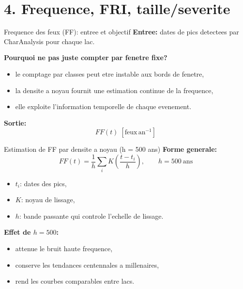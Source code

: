 \documentclass[aspectratio=169,11pt]{beamer}
\begin{document}
\section{4. Frequence, FRI, taille/severite}

\begin{frame}{Frequence des feux (FF): entree et objectif}
\textbf{Entree:} dates de pics detectees par CharAnalysis pour chaque lac.

\textbf{Pourquoi ne pas juste compter par fenetre fixe?}
\begin{itemize}
  \item le comptage par classes peut etre instable aux bords de fenetre,
  \item la densite a noyau fournit une estimation continue de la frequence,
  \item elle exploite l'information temporelle de chaque evenement.
\end{itemize}

\textbf{Sortie:}
\[
FF(t)\; [\mathrm{feux}\,\mathrm{an}^{-1}]
\]
\end{frame}

\begin{frame}{Estimation de FF par densite a noyau (h = 500 ans)}
\textbf{Forme generale:}
\[
FF(t) = \frac{1}{h}\sum_i K\!\left(\frac{t-t_i}{h}\right),\qquad h=500\ \text{ans}
\]
\begin{itemize}
  \item \(t_i\): dates des pics,
  \item \(K\): noyau de lissage,
  \item \(h\): bande passante qui controle l'echelle de lissage.
\end{itemize}

\textbf{Effet de \(h=500\):}
\begin{itemize}
  \item attenue le bruit haute frequence,
  \item conserve les tendances centennales a millenaires,
  \item rend les courbes comparables entre lacs.
\end{itemize}
\end{frame}
\end{document}
